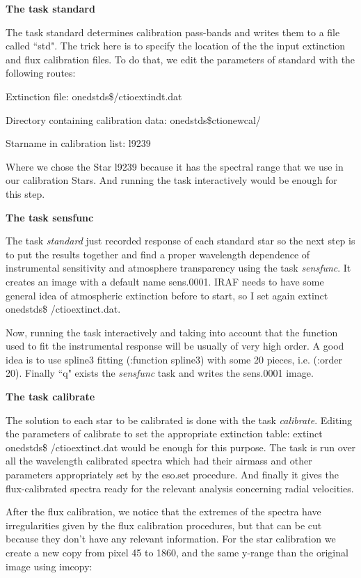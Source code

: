 \textbf{The task standard}

The task standard determines calibration pass-bands and writes them to a file called ``std". The trick here is to specify the location of the the input extinction and flux calibration files. To do that, we edit the parameters of standard with the following routes:

Extinction file:                              onedstds\$/ctioextindt.dat

Directory containing calibration data:   onedstds\$ctionewcal/

Starname in calibration list:                l9239

Where we chose the Star l9239 because it has the spectral range that we use in our calibration Stars. And running the task interactively would be enough for this step.

\textbf{The task sensfunc}

The task \textit{standard} just recorded response of each standard star so the next step is to put the results together and find a proper wavelength dependence of instrumental sensitivity and atmosphere transparency using the task \textit{sensfunc}. It creates an image with a default name sens.0001. IRAF needs to have some general idea of atmospheric extinction before to start, so I set again extinct onedstds\$ /ctioextinct.dat.

Now, running the task interactively and taking into account that the function used to fit the instrumental response will be usually of very high order. A good idea is to use spline3 fitting (:function spline3) with some 20 pieces, i.e. (:order 20).
Finally ``q" exists the \textit{sensfunc} task and writes the sens.0001 image.

\textbf{The task calibrate}

The solution to each star to be calibrated is done with the task \textit{calibrate}. Editing the parameters of calibrate to set the appropriate extinction table: extinct onedstds\$ /ctioextinct.dat would be enough for this purpose. The task is run over all the wavelength calibrated spectra which had their airmass and other parameters appropriately set by the eso.set procedure. And finally it gives the flux-calibrated spectra ready for the relevant analysis concerning radial velocities.

After the flux calibration, we notice that the extremes of the spectra have irregularities given by the flux calibration procedures, but that can be cut because they don't have any relevant information. For the star calibration we create a new copy from pixel 45 to 1860, and the same y-range than the original image using imcopy:

